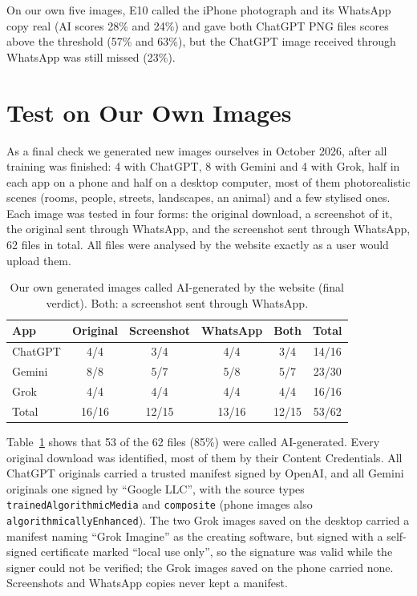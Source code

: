 \documentclass{mnnit}
\begin{document}
On our own five images, E10 called the iPhone photograph and its
WhatsApp copy real (AI scores 28\% and 24\%) and gave both ChatGPT PNG
files scores above the threshold (57\% and 63\%), but the ChatGPT image
received through WhatsApp was still missed (23\%).

\section{Test on Our Own Images}
\label{sec:fresh}
As a final check we generated new images ourselves in October 2026,
after all training was finished: 4 with ChatGPT, 8 with Gemini and 4
with Grok, half in each app on a phone and half on a desktop computer,
most of them photorealistic scenes (rooms, people, streets,
landscapes, an animal) and a few stylised ones. Each image was tested in
four forms: the original download, a screenshot of it, the original sent
through WhatsApp, and the screenshot sent through WhatsApp, 62 files in
total. All files were analysed by
the website exactly as a user would upload them.

\begin{table}[htbp]
\centering
\caption[Our own generated images called AI-generated by the website (final verdict)]{Our own generated images called AI-generated by the website (final verdict). Both: a screenshot sent through WhatsApp.}
\label{tab:fresh}
\small
\setlength{\tabcolsep}{5pt}
\begin{tabular}{l|cccc|c}
\toprule
\textbf{App} & \textbf{Original} & \textbf{Screenshot} & \textbf{WhatsApp} & \textbf{Both} & \textbf{Total}\\
\midrule
ChatGPT & 4/4 & 3/4 & 4/4 & 3/4 & 14/16\\
Gemini & 8/8 & 5/7 & 5/8 & 5/7 & 23/30\\
Grok & 4/4 & 4/4 & 4/4 & 4/4 & 16/16\\
\midrule
Total & 16/16 & 12/15 & 13/16 & 12/15 & 53/62\\
\bottomrule
\end{tabular}
\end{table}

\begin{sloppypar}
Table~\ref{tab:fresh} shows that 53 of the 62 files (85\%) were called
AI-generated. Every original download was identified, most of them by
their Content Credentials. All ChatGPT originals carried a trusted
manifest signed by OpenAI, and all Gemini originals one signed by
``Google LLC'', with the source types \texttt{trainedAlgorithmicMedia}
and \texttt{composite} (phone images also
\texttt{algorithmicallyEnhanced}). The two Grok images saved on the
desktop carried a manifest naming ``Grok Imagine'' as the creating
software, but signed with a self-signed certificate marked ``local use
only'', so the signature was valid while the signer could not be
verified; the Grok images saved on the phone carried none. Screenshots
and WhatsApp copies never kept a manifest.
\end{sloppypar}
\end{document}
